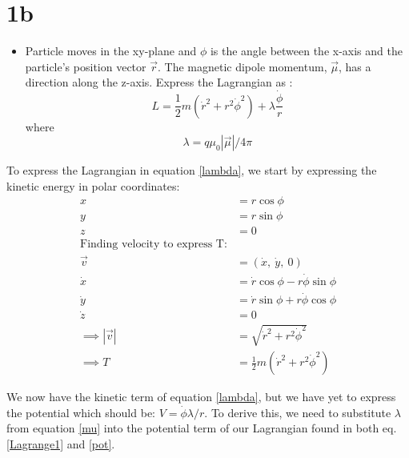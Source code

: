 \documentclass{report}
\begin{document}
\section*{1b}
\begin{itemize}
\item Particle moves in the xy-plane and $\phi$ is the angle between the x-axis and the particle's position vector $\vec{r}$. The magnetic dipole momentum, $\vec{\mu}$, has a direction along the z-axis.
Express the Lagrangian as : \begin{equation}
L = \frac{1}{2}m(\dot{r}^2+r^2\dot{\phi}^2) + \lambda\frac{\dot{\phi}}{r}\label{lambda}
\end{equation}
where \begin{equation}\lambda = q\mu_0|\vec{\mu}|/4\pi\label{mu}\end{equation}
\end{itemize}
To express the Lagrangian in equation \ref{lambda}, we start by expressing the kinetic energy in polar coordinates:
\begin{align*}
x &= r\cos{\phi}\\
y&= r\sin{\phi}\\
z&=0\\
\text{Finding velocity to express T:}\\
\vec{v} &= (\dot{x},\ \dot{y},\ 0)\\
\dot{x} &= \dot{r}\cos{\phi} - r\dot{\phi}\sin{\phi}\\
\dot{y} &= \dot{r}\sin{\phi} + r\dot{\phi}\cos{\phi}\\
\dot{z} &=0\\
\implies |\vec{v}| &= \sqrt{\dot{r}^2 + r^2\dot{\phi}^2}\\
\implies T &= \frac{1}{2}m(\dot{r}^2 + r^2\dot{\phi}^2)
\end{align*}

We now have the kinetic term of equation \ref{lambda}, but we have yet to express the potential which should be:
$V =\dot{\phi} \lambda/r$. To derive this, we need to substitute $\lambda$ from equation \ref{mu} into the potential term of our Lagrangian found in both eq. \ref{Lagrange1} and \ref{pot}.
\end{document}
